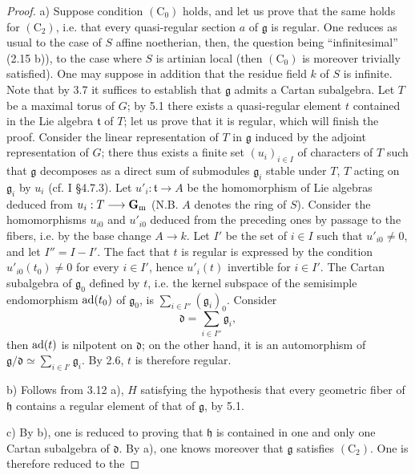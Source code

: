 \begin{proof}
a) Suppose condition
$(\mathrm C_0)$
holds, and let
us prove that
the same holds
for $(\mathrm C_2)$,
i.e. that every
quasi-regular
section $a$ of
$\mathfrak g$ is
regular. One
reduces as usual
to the case
of $S$ affine
noetherian, then,
the question being
``infinitesimal''
(2.15 b)), to
the case where
$S$ is artinian
local (then
$(\mathrm C_0)$
is moreover
trivially satisfied).
One may suppose
in addition that
the residue field
$k$ of $S$ is
infinite. Note
that by 3.7
it suffices to
establish that
$\mathfrak g$
admits a Cartan
subalgebra. Let
$T$ be a maximal
torus of $G$;
by 5.1 there
exists a
quasi-regular
element $t$
contained in the
Lie algebra
$\mathfrak t$ of
$T$; let us
prove that it
is regular,
which will finish
the proof.
Consider the
linear representation
of $T$ in
$\mathfrak g$
induced by the
adjoint representation
of $G$; there
thus exists a
finite set
$(u_i)_{i\in I}$
of characters of
$T$ such that
$\mathfrak g$
decomposes as a
direct sum of
submodules
$\mathfrak g_i$
stable under $T$,
$T$ acting on
$\mathfrak g_i$
by $u_i$ (cf.
I \S 4.7.3).
Let
$u'_i:\mathfrak t\to A$
be the homomorphism
of Lie algebras
deduced from
$u_i:T\longrightarrow\mathbf{G}_{\mathrm{m}}$
(N.B. $A$
denotes the ring
of $S$).
Consider the
homomorphisms
$u_{i0}$ and
$u'_{i0}$ deduced
from the preceding
ones by passage
to the fibers,
i.e. by the
base change
$A\to k$.
Let $I'$ be
the set of
$i\in I$ such
that $u'_{i0}\ne0$,
and let
$I''=I-I'$.
The fact that
$t$ is regular
is expressed by
the condition
$u'_{i0}(t_0)\ne0$
for every
$i\in I'$,
hence $u'_i(t)$
invertible for
$i\in I'$.
The Cartan
subalgebra of
$\mathfrak g_0$
defined by $t$,
i.e. the kernel
subspace of the
semisimple endomorphism
$\operatorname{ad}(t_0)$ of
$\mathfrak g_0$,
is
$\sum_{i\in I''}(\mathfrak g_i)_0$.
Consider
\[
 \mathfrak d=\sum_{i\in I''}\mathfrak g_i,
\]
then $\operatorname{ad}(t)$
is nilpotent on
$\mathfrak d$;
on the other
hand, it is
an automorphism
of
$\mathfrak g/\mathfrak d\simeq\sum_{i\in I'}\mathfrak g_i$.
By 2.6, $t$
is therefore regular.

\noindent b) Follows
from 3.12 a),
$H$ satisfying
the hypothesis
that every
geometric fiber
of $\mathfrak h$
contains a regular
element of that
of $\mathfrak g$,
by 5.1.

\noindent c) By b),
one is reduced
to proving that
$\mathfrak h$ is
contained in one
and only one
Cartan subalgebra
of $\mathfrak d$.
By a), one
knows moreover
that $\mathfrak g$
satisfies
$(\mathrm C_2)$.
One is therefore
reduced to the


\end{proof}
